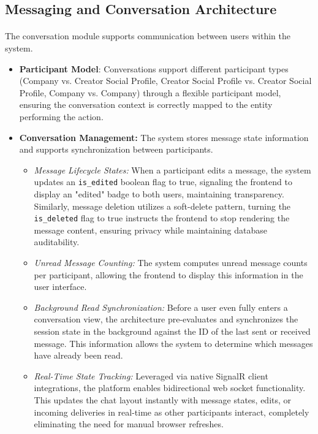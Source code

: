 \subsection{Messaging and Conversation Architecture}
\paragraph{}The conversation module supports communication between users within the system.
\begin{itemize}
    \item \textbf{Participant Model}: Conversations support different participant types (Company vs. Creator Social Profile, Creator Social Profile vs. Creator Social Profile, Company vs. Company) through a flexible participant model, ensuring the conversation context is correctly mapped to the entity performing the action.
    \item \textbf{Conversation Management:} The system stores message state information and supports synchronization between participants.
        \begin{itemize}
            \item \textit{Message Lifecycle States:} When a participant edits a message, the system updates an \texttt{is\_edited} boolean flag to true, signaling the frontend to display an "edited" badge to both users, maintaining transparency. Similarly, message deletion utilizes a soft-delete pattern, turning the \texttt{is\_deleted} flag to true instructs the frontend to stop rendering the message content, ensuring privacy while maintaining database auditability.
            \item \textit{Unread Message Counting:} The system computes unread message counts per participant, allowing the frontend to display this information in the user interface.
            \item \textit{Background Read Synchronization:} Before a user even fully enters a conversation view, the architecture pre-evaluates and synchronizes the session state in the background against the ID of the last sent or received message. This information allows the system to determine which messages have already been read.
            \item \textit{Real-Time State Tracking:} Leveraged via native SignalR client integrations, the platform enables bidirectional web socket functionality. This updates the chat layout instantly with message states, edits, or incoming deliveries in real-time as other participants interact, completely eliminating the need for manual browser refreshes.

\end{itemize}
\end{itemize}
